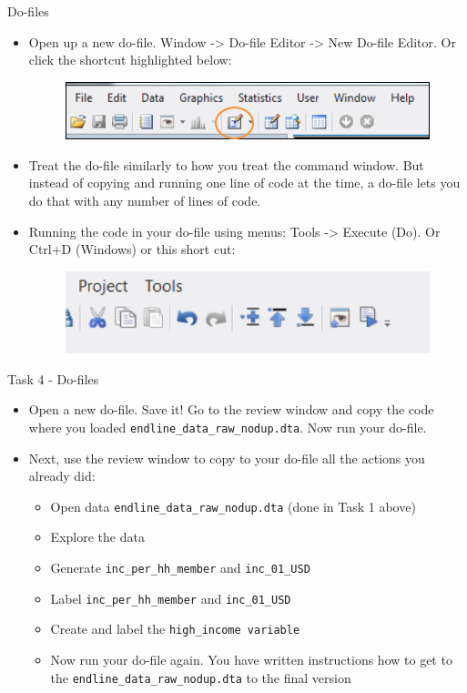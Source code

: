 \documentclass[aspectratio=169]{beamer}
\begin{document}
\begin{frame}{Do-files}
	\begin{itemize}
		\item Open up a new do-file. Window -> Do-file Editor -> New Do-file Editor. Or click the shortcut highlighted below:
		\begin{figure}
			\centering
			\includegraphics[width=.6\linewidth]{img/dofilewindow1}
		\end{figure}
		\item Treat the do-file similarly to how you treat the command window. But instead of copying and running one line of code at the time, a do-file lets you do that with any number of lines of code.
		\item Running the code in your do-file using menus: Tools -> Execute (Do). Or Ctrl+D (Windows) or this short cut:
		\begin{figure}
			\centering
			\includegraphics[width=.5\linewidth]{img/dofilewindow2}
		\end{figure}
	\end{itemize}
\end{frame}

\begin{frame}{Task 4 - Do-files}
	\begin{itemize}
		\item Open a new do-file. Save it! Go to the review window and copy the code where you loaded \texttt{endline\_data\_raw\_nodup.dta}. Now run your do-file.
		\item Next, use the review window to copy to your do-file all the actions you already did:
		\begin{itemize}
			\item Open data \texttt{endline\_data\_raw\_nodup.dta} (done in Task 1 above)
			\item Explore the data
			\item Generate \texttt{inc\_per\_hh\_member} and \texttt{inc\_01\_USD}
			\item Label \texttt{inc\_per\_hh\_member} and \texttt{inc\_01\_USD}
			\item Create and label the \texttt{high\_income variable}
			\item Now run your do-file again. You have written instructions how to get to the \texttt{endline\_data\_raw\_nodup.dta} to the final version
		\end{itemize}
	\end{itemize}
\end{frame}
\end{document}
